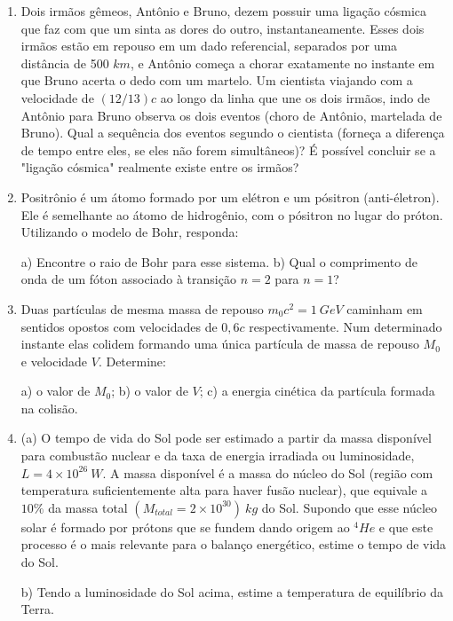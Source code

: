 \begin{enumerate}[start=1,label={\bfseries Q\arabic*.}]
\item Dois irmãos gêmeos, Antônio e Bruno, dezem possuir uma ligação cósmica que faz com que um sinta as dores do outro, instantaneamente. Esses dois irmãos estão em repouso em um dado referencial, separados por uma distância de 500 $km$, e Antônio começa a chorar exatamente no instante em que Bruno acerta o dedo com um martelo. Um cientista viajando com a velocidade de $(12/13)c$ ao longo da linha que une os dois irmãos, indo de Antônio para Bruno observa os dois eventos (choro de Antônio, martelada de Bruno). Qual a sequência dos eventos segundo o cientista (forneça a diferença de tempo entre eles, se eles não forem simultâneos)? É possível concluir se a "ligação cósmica" realmente existe entre os irmãos?


\item Positrônio é um átomo formado por um elétron e um pósitron (anti-életron). Ele é semelhante ao átomo de hidrogênio, com o pósitron no lugar do próton. Utilizando o modelo de Bohr, responda:

a) Encontre o raio de Bohr para esse sistema.
b) Qual o comprimento de onda de um fóton associado à transição $n=2$ para $n=1$?




\item Duas partículas de mesma massa de repouso $m_{0}c^{2} = 1 \ GeV$ caminham em sentidos opostos com velocidades de $0,6c$ respectivamente. Num determinado instante elas colidem formando uma única partícula de massa de repouso $M_{0}$ e velocidade $V$. Determine:

  a) o valor de $M_{0}$;
  b) o valor de $V$;
  c) a energia cinética da partícula formada na colisão.




\item (a) O tempo de vida do Sol pode ser estimado a partir da massa disponível para combustão nuclear e da taxa de energia irradiada ou luminosidade, $L = 4 \times 10^{26} \ W$. A massa disponível é a massa do núcleo do Sol (região com temperatura suficientemente alta para haver fusão nuclear), que equivale a $10\%$ da massa total $(M_{total} = 2 \times 10^{30}) \ kg$ do Sol. Supondo que esse núcleo solar é formado por prótons que se fundem dando origem ao $^{4}He$ e que este processo é o mais relevante para o balanço energético, estime o tempo de vida do Sol.


  b) Tendo a luminosidade do Sol acima, estime a temperatura de equilíbrio da Terra.





\end{enumerate}

